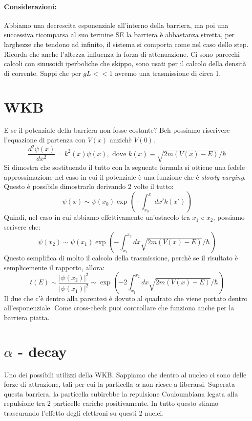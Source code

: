 \paragraph{Considerazioni:} Abbiamo una decrescita esponenziale all'interno della barriera, ma poi una successiva ricomparsa al suo termine SE la barriera è abbastanza stretta, per larghezze che tendono ad infinito, il sistema si comporta come nel caso dello step. Ricorda che anche l'altezza influenza la forza di attenuazione. Ci sono parecchi calcoli con sinusoidi iperboliche che skippo, sono usati per il calcolo della densità di corrente. Sappi che per $gL << 1$ avremo una trasmissione di circa 1.

\section{WKB}

E se il potenziale della barriera non fosse costante? Beh possiamo riscrivere l'equazione di partenza con $V(x)$ anzichè $V(0)$.
$$\frac{d^2\psi(x)}{dx^2}=k^2(x)\psi(x), \text{ dove } k(x) \equiv \sqrt{2m(V(x) - E)} / \hbar$$
Si dimostra che sostituendo il tutto con la seguente formula si ottiene una fedele approssimazione nel caso in cui il potenziale è una funzione che è \textit{slowly varying}. Questo è possibile dimostrarlo derivando 2 volte il tutto:
$$\psi(x) \sim \psi(x_0)\exp\left( -\int_{x_0}^{x} dx'k(x') \right)$$
Quindi, nel caso in cui abbiamo effettivamente un'ostacolo tra $x_1$ e $x_2$, possiamo scrivere che:
$$\psi(x_2) \sim \psi(x_1) \exp \left( - \int_{x_1}^{x_2} dx \sqrt{2m(V(x) - E)}/\hbar \right)$$
Questo semplifica di molto il calcolo della trasmissione, perchè se il risultato è semplicemente il rapporto, allora:
$$t(E) \sim \frac{|\psi(x_2)|^2}{|\psi(x_1)|^2} \sim \exp \left( - 2 \int_{x_1}^{x_2} dx \sqrt{2m(V(x) - E)}/\hbar \right)$$
Il due che c'è dentro alla parentesi è dovuto al quadrato che viene portato dentro all'esponenziale. Come cross-check puoi controllare che funziona anche per la barriera piatta.

\section{$\alpha$ - decay}

Uno dei possibili utilizzi della WKB. Sappiamo che dentro al nucleo ci sono delle forze di attrazione, tali per cui la particella $\alpha$ non riesce a liberarsi. Superata questa barriera, la particella subirebbe la repulsione Couloumbiana legata alla repulsione tra 2 particelle cariche positivamente. In tutto questo stiamo trascurando l'effetto degli elettroni su questi 2 nuclei.

